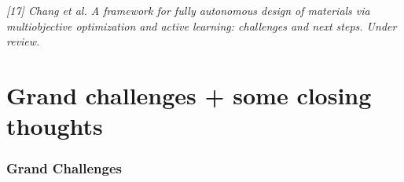 \documentclass[aspectratio=169]{beamer}
\begin{document}
\begin{frame}
\vfill

{\tiny\it
[17] Chang et al.
A framework for fully autonomous design of materials via multiobjective optimization and active learning: challenges and next steps.
Under review.\\
}

\end{frame}

\section{Grand challenges + some closing thoughts}

\begin{frame}\frametitle{Grand Challenges}

\end{frame}
\end{document}
